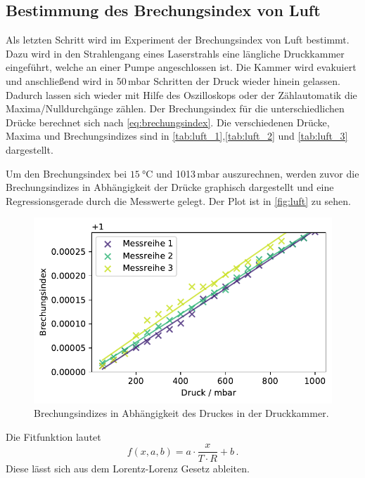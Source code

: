 \subsection{Bestimmung des Brechungsindex von Luft}
Als letzten Schritt wird im Experiment der Brechungsindex von Luft bestimmt.
Dazu wird in den Strahlengang eines Laserstrahls eine längliche Druckkammer eingeführt, welche an einer
Pumpe angeschlossen ist. Die Kammer wird evakuiert und anschließend wird in 50\,mbar Schritten der Druck
wieder hinein gelassen.
Dadurch lassen sich wieder mit Hilfe des Oszilloskops oder der Zählautomatik die Maxima/Nulldurchgänge zählen.
Der Brechungsindex für die unterschiedlichen Drücke berechnet sich nach \autoref{eq:brechungsindex}.
Die verschiedenen Drücke, Maxima und Brechungsindizes sind in \autoref{tab:luft_1},\autoref{tab:luft_2} und \autoref{tab:luft_3}
dargestellt.



\FloatBarrier
Um den Brechungsindex bei $\SI{15}{\celsius}$ und 1013\,mbar auszurechnen, werden zuvor die Brechungsindizes
in Abhängigkeit der Drücke graphisch dargestellt und eine Regressionsgerade durch die Messwerte gelegt.
Der Plot ist in \autoref{fig:luft} zu sehen.
\begin{figure}
    \centering
    \includegraphics[width=0.8\linewidth]{Plots/Brechungsindex.pdf}
    \caption{Brechungsindizes in Abhängigkeit des Druckes in der Druckkammer.}
    \label{fig:luft}
\end{figure}
\FloatBarrier
Die Fitfunktion lautet 
\begin{equation}
    f(x, a, b) = a \cdot \frac{x}{T \cdot R} + b \, .
    \label{eqn:fit}
\end{equation}
Diese lässt sich aus dem Lorentz-Lorenz Gesetz ableiten.
